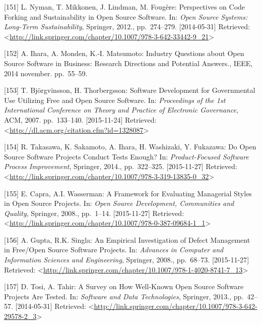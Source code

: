 \documentclass[12pt,magyar,a4paper,oneside]{scrreprt}
\newenvironment{cslreferences}%
  {}%
  {\par}
\begin{document}
\begin{cslreferences}
\leavevmode\hypertarget{ref-nyman_perspectives_2012}{}%
{[}151{]} L. Nyman, T. Mikkonen, J. Lindman, M. Fougère: Perspectives on
Code Forking and Sustainability in Open Source Software. In: \emph{Open
Source Systems: Long-Term Sustainability}, Springer, 2012.,
pp.~274--279. {[}2014-05-31{]} Retrieved:
\textless{}\url{http://link.springer.com/chapter/10.1007/978-3-642-33442-9_21}\textgreater{}

\leavevmode\hypertarget{ref-ihara_industry_2014}{}%
{[}152{]} A. Ihara, A. Monden, K.-I. Matsumoto: Industry Questions about
Open Source Software in Business: Research Directions and Potential
Answers., IEEE, 2014 november. pp.~55--59.

\leavevmode\hypertarget{ref-bjorgvinsson_software_2007}{}%
{[}153{]} T. Björgvinsson, H. Thorbergsson: Software Development for
Governmental Use Utilizing Free and Open Source Software. In:
\emph{Proceedings of the 1st International Conference on Theory and
Practice of Electronic Governance}, ACM, 2007. pp.~133--140.
{[}2015-11-24{]} Retrieved:
\textless{}\url{http://dl.acm.org/citation.cfm?id=1328087}\textgreater{}

\leavevmode\hypertarget{ref-takasawa_open_2014}{}%
{[}154{]} R. Takasawa, K. Sakamoto, A. Ihara, H. Washizaki, Y. Fukazawa:
Do Open Source Software Projects Conduct Tests Enough? In:
\emph{Product-Focused Software Process Improvement}, Springer, 2014.,
pp.~322--325. {[}2015-11-27{]} Retrieved:
\textless{}\url{http://link.springer.com/chapter/10.1007/978-3-319-13835-0_32}\textgreater{}

\leavevmode\hypertarget{ref-capra_framework_2008}{}%
{[}155{]} E. Capra, A.I. Wasserman: A Framework for Evaluating
Managerial Styles in Open Source Projects. In: \emph{Open Source
Development, Communities and Quality}, Springer, 2008., pp.~1--14.
{[}2015-11-27{]} Retrieved:
\textless{}\url{http://link.springer.com/chapter/10.1007/978-0-387-09684-1_1}\textgreater{}

\leavevmode\hypertarget{ref-gupta_empirical_2008}{}%
{[}156{]} A. Gupta, R.K. Singla: An Empirical Investigation of Defect
Management in Free/Open Source Software Projects. In: \emph{Advances in
Computer and Information Sciences and Engineering}, Springer, 2008.,
pp.~68--73. {[}2015-11-27{]} Retrieved:
\textless{}\url{http://link.springer.com/chapter/10.1007/978-1-4020-8741-7_13}\textgreater{}

\leavevmode\hypertarget{ref-tosi_survey_2013}{}%
{[}157{]} D. Tosi, A. Tahir: A Survey on How Well-Known Open Source
Software Projects Are Tested. In: \emph{Software and Data Technologies},
Springer, 2013., pp.~42--57. {[}2014-05-31{]} Retrieved:
\textless{}\url{http://link.springer.com/chapter/10.1007/978-3-642-29578-2_3}\textgreater{}


\end{cslreferences}
\end{document}
